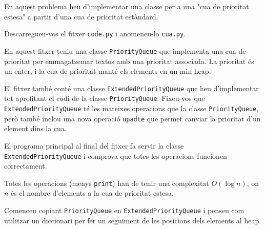 

\Statement

En aquest problema heu d'implementar una classe per a una "cua de prioritat estesa" a partir d'una cua de prioritat estàndard.

\medskip

Descarregueu-vos el fitxer \texttt{code.py} i anomeneu-lo \texttt{cua.py}.

\medskip

En aquest fitxer teniu una classe \texttt{PriorityQueue} que implementa una cua de prioritat per emmagatzemar textos amb una prioritat associada. La prioritat és un enter, i la cua de prioritat manté els elements en un min heap.

\medskip

El fitxer també conté una classe \texttt{ExtendedPriorityQueue} que heu d'implementar tot aprofitant el codi de la classe \texttt{PriorityQueue}. Fixeu-vos que \texttt{ExtendedPriorityQueue} té les mateixes operacions que la classe \texttt{PriorityQueue}, però també inclou una nova operació  \texttt{upadte} que permet canviar la prioritat d'un element dins la cua.

\medskip

El programa principal al final del fitxer fa servir la classe \texttt{ExtendedPriorityQueue} i comprova que totes les operacions funcionen correctament.

\medskip

Totes les operacions (menys \texttt{print}) han de tenir una complexitat $O(\log n)$, on $n$ és el nombre d'elements a la cua de prioritat estesa.

\Hint

Comenceu copiant \texttt{PriorityQueue} en \texttt{ExtendedPriorityQueue} i penseu com utilitzar un diccionari per fer un seguiment de les posicions dels elements al heap.

\SampleOneCol
